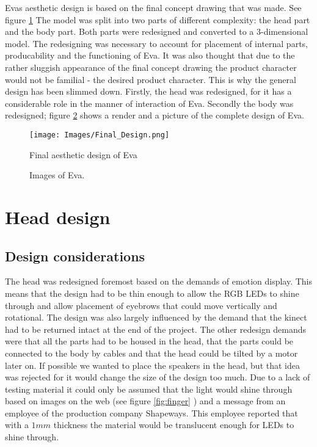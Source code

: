 \documentclass[technical_document.tex]{subfiles}
\begin{document}
Eva\textquotesingle s aesthetic design is based on the final concept drawing that was made. See figure \ref{fig:final_design}  The model was split into two parts of different complexity: the head part and the body part. Both parts were redesigned and converted to a 3-dimensional model. The redesigning was necessary to account for placement of internal parts, producability and the functioning of Eva. It was also thought that due to the rather sluggish  appearance of the final concept drawing the product character would not be familial - the desired product character. This is why the general design has been slimmed down. Firstly, the head was redesigned, for it has a considerable role in the manner of interaction of Eva. Secondly the body was redesigned; figure \ref{Eva} shows a render and a picture of the complete design of Eva.

\begin{figure}[h]
	\centering
	\mbox{\texttt{[image: Images/Final\_Design.png]}}
	\caption{Final aesthetic design of Eva}
	\label{fig:final_design}
\end{figure}

 \begin{figure}[h!]
  \centering
  \hspace{2mm}            
  \caption{Images of Eva.}
  \label{Eva}
\end{figure}

\section{Head design}
\subsection*{Design considerations}
The head was redesigned foremost based on the demands of emotion display. This means that the design had to be thin enough 
to allow the RGB LEDs to shine through and allow placement of eyebrows that could move vertically and rotational. The 
design was also largely influenced by the demand that the kinect had to be returned intact at the end of the project. The 
other redesign demands were that all the parts had to be housed in the head, that the parts could be connected to the body 
by cables and that the head could be tilted by a motor later on. If possible we wanted  to place the speakers in the head, 
but that idea was rejected for it would change the size of the design too much. Due to a lack of testing material it could only be assumed that the light would shine through based on images on the web (see figure \ref{fig:finger} ) and a message 
from an employee of the production company Shapeways. This employee reported that with a $1 mm$ thickness the material would 
be translucent enough for LEDs to shine through.
\end{document}
